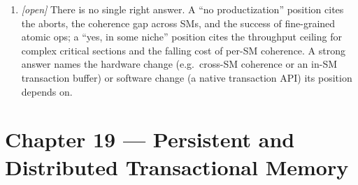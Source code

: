 \begin{enumerate}
          a Bloom filter and validates lazily at commit against those logs;
          GUST validates against a warp-level commit log via CCT/MRV.  The
          unit contrast to draw: KILO TM's validation state lives in
          per-thread hardware/bloom structures and is checked against
          per-location versions; GUST's lives in a shared commit log checked
          against recorded snapshots.  An abort in KILO TM discards the
          thread's logs and filter; an abort in GUST must roll back or mask
          the offending warp's published writes.
    \item \emph{[open]} There is no single right answer.  A ``no
          productization'' position cites the aborts, the coherence gap
          across SMs, and the success of fine-grained atomic ops; a ``yes,
          in some niche'' position cites the throughput ceiling for
          complex critical sections and the falling cost of per-SM
          coherence.  A strong answer names the hardware change (e.g.\
          cross-SM coherence or an in-SM transaction buffer) or software
          change (a native transaction API) its position depends on.
\end{enumerate}

\section*{Chapter 19 --- Persistent and Distributed Transactional Memory}

